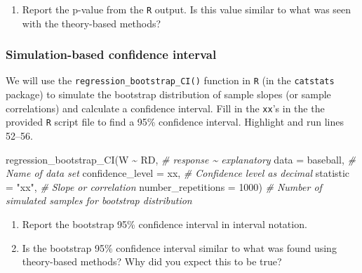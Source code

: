 \documentclass[
]{report}
\newenvironment{Shaded}{\begin{snugshade}}{\end{snugshade}}
\newcommand{\AttributeTok}[1]{\textcolor[rgb]{0.77,0.63,0.00}{#1}}
\newcommand{\CommentTok}[1]{\textcolor[rgb]{0.56,0.35,0.01}{\textit{#1}}}
\newcommand{\DecValTok}[1]{\textcolor[rgb]{0.00,0.00,0.81}{#1}}
\newcommand{\FunctionTok}[1]{\textcolor[rgb]{0.00,0.00,0.00}{#1}}
\newcommand{\NormalTok}[1]{#1}
\newcommand{\SpecialCharTok}[1]{\textcolor[rgb]{0.00,0.00,0.00}{#1}}
\newcommand{\StringTok}[1]{\textcolor[rgb]{0.31,0.60,0.02}{#1}}
\providecommand{\tightlist}{%
  \setlength{\itemsep}{0pt}\setlength{\parskip}{0pt}}
\begin{document}
\begin{enumerate}
\def\labelenumi{\arabic{enumi}.}
\setcounter{enumi}{2}
\tightlist
\item
  Report the p-value from the \texttt{R} output. Is this value similar to what was seen with the theory-based methods?
\end{enumerate}

\vspace{0.5in}

\hypertarget{simulation-based-confidence-interval-1}{%
\subsubsection*{Simulation-based confidence interval}\label{simulation-based-confidence-interval-1}}

We will use the \texttt{regression\_bootstrap\_CI()} function in \texttt{R} (in the \texttt{catstats} package) to simulate the bootstrap distribution of sample slopes (or sample correlations) and calculate a confidence interval. Fill in the \texttt{xx}'s in the the provided \texttt{R} script file to find a 95\% confidence interval. Highlight and run lines 52--56.

\begin{Shaded}
\begin{Highlighting}[]
\FunctionTok{regression\_bootstrap\_CI}\NormalTok{(W }\SpecialCharTok{\textasciitilde{}}\NormalTok{ RD, }\CommentTok{\# response \textasciitilde{} explanatory}
   \AttributeTok{data =}\NormalTok{ baseball, }\CommentTok{\# Name of data set}
   \AttributeTok{confidence\_level =}\NormalTok{ xx, }\CommentTok{\# Confidence level as decimal}
   \AttributeTok{statistic =} \StringTok{"xx"}\NormalTok{, }\CommentTok{\# Slope or correlation}
   \AttributeTok{number\_repetitions =} \DecValTok{1000}\NormalTok{) }\CommentTok{\# Number of simulated samples for bootstrap distribution}
\end{Highlighting}
\end{Shaded}

\begin{enumerate}
\def\labelenumi{\arabic{enumi}.}
\setcounter{enumi}{3}
\item
  Report the bootstrap 95\% confidence interval in interval notation.\\
  \vspace{0.5in}
\item
  Is the bootstrap 95\% confidence interval similar to what was found using theory-based methods? Why did you expect this to be true?
\end{enumerate}
\end{document}
